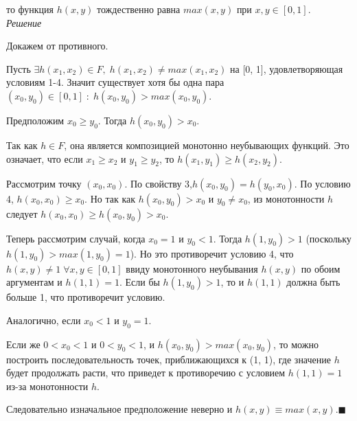 \documentclass[a4paper,12pt]{article}
\begin{document}
то функция $h(x, y)$ тождественно равна $max(x, y)$ при $x, y \in [0, 1]$.\\

\textit{Решение}

Докажем от противного.

Пусть $\exists h(x_1, x_2) \in F, \; h(x_1, x_2) \neq max(x_1, x_2)$ на [0, 1], удовлетворяющая условиям 1-4.  Значит существует хотя бы одна пара $(x_0, y_0) \in [0, 1] \; : \; h(x_0, y_0)> max(x_0, y_0)$.

Предположим $x_0 \geq y_0$. Тогда $h(x_0, y_0) > x_0$.

Так как $h \in F$,  она является композицией монотонно неубывающих функций.  Это означает, что если $x_1 \geq x_2$ и $y_1 \geq y_2$, то $h(x_1, y_1) \geq h(x_2, y_2)$.

Рассмотрим точку $(x_0, x_0)$.  По свойству 3,$ h(x_0, y_0) = h(y_0, x_0)$.  По условию 4, $h(x_0, x_0) \geq x_0$.  Но так как $h(x_0, y_0) > x_0$ и $y_0 \neq x_0$,  из монотонности $h$ следует   $h(x_0, x_0) \geq h(x_0, y_0) > x_0$.

Теперь рассмотрим случай, когда $x_0 = 1$ и $y_0 < 1$.  Тогда $h(1, y_0) > 1$  (поскольку $h(1,y_0) > max(1, y_0) = 1$). Но это противоречит условию 4, что $h(x,y) \neq 1 \; \forall x, y \in [0, 1]$ ввиду монотонного неубывания $h(x,y)$ по обоим аргументам и $h(1,1) = 1$.  Если бы $h(1, y_0) > 1$, то и $h(1,1)$ должна быть больше 1, что противоречит условию.

Аналогично, если  $x_0 < 1$ и $y_0 = 1$.

Если же $0 < x_0 < 1$ и $0 < y_0 < 1$, и  $h(x_0, y_0) > max(x_0, y_0)$, то можно построить последовательность точек, приближающихся к (1, 1),  где значение $h$ будет продолжать расти, что приведет к противоречию с условием $h(1, 1) = 1$ из-за монотонности $h$.

Следовательно изначальное предположение неверно и $h(x,y)\equiv max(x,y).\blacksquare$
\end{document}
